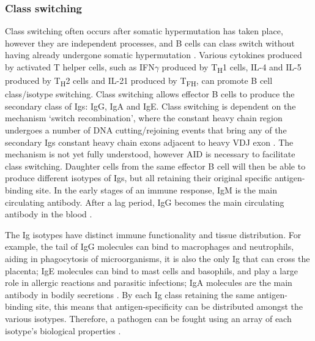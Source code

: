 \subsubsection{Class switching}
Class switching often occurs after somatic hypermutation has taken place, however they are independent processes, and B cells can class switch without having already undergone somatic hypermutation \cite{mak2014b}.
Various cytokines produced by activated T helper cells, such as IFN$\gamma$ produced by T\textsubscript{H}1 cells, IL-4 and IL-5 produced by T\textsubscript{H}2 cells and IL-21 produced by T\textsubscript{FH}, can promote B cell class/isotype switching.
Class switching allows effector B cells to produce the secondary class of Igs: IgG, IgA and IgE\@.
Class switching is dependent on the mechanism `switch recombination', where the constant heavy chain region undergoes a number of DNA cutting/rejoining events that bring any of the secondary Igs constant heavy chain exons adjacent to heavy VDJ exon \cite{mak2014b}.
The mechanism is not yet fully understood, however AID is necessary to facilitate class switching.
Daughter cells from the same effector B cell will then be able to produce different isotypes of Igs, but all retaining their original specific antigen-binding site.
In the early stages of an immune response, IgM is the main circulating antibody.
After a lag period, IgG becomes the main circulating antibody in the blood \cite{alberts2007molecularimmune}.

The Ig isotypes have distinct immune functionality and tissue distribution.
For example, the tail of IgG molecules can bind to macrophages and neutrophils, aiding in phagocytosis of microorganisms, it is also the only Ig that can cross the placenta; IgE molecules can bind to mast cells and basophils, and play a large role in allergic reactions and parasitic infections; IgA molecules are the main antibody in bodily secretions \cite{alberts2007molecularimmune}.
By each Ig class retaining the same antigen-binding site, this means that antigen-specificity can be distributed amongst the various isotypes.
Therefore, a pathogen can be fought using an array of each isotype's biological properties \cite{xu2012immunoglobulin}.


